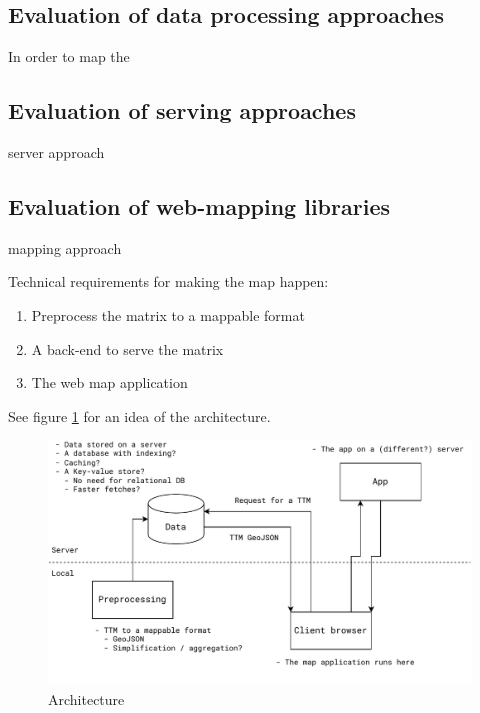 

\subsection{Evaluation of data processing approaches}
In order to map the 


\subsection{Evaluation of serving approaches}
server approach

\subsection{Evaluation of web-mapping libraries}
mapping approach

Technical requirements for making the map happen:
\begin{enumerate}
	\item Preprocess the matrix to a mappable format
	\item A back-end to serve the matrix
	\item The web map application
\end{enumerate}

See figure \ref{fig:architechture} for an idea of the architecture.

\begin{figure}[H]
	\centering
	\includegraphics[width=1\textwidth]{images/architechture}
	\caption{Architecture}
	\label{fig:architechture}
\end{figure}


